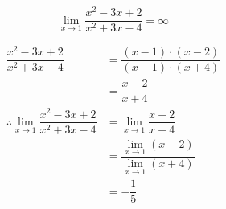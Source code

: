 \documentclass[14pt,fleqn]{extarticle}
\begin{document}
 

\begin{snippet}
    
    
    \incorrect

\[ \lim_{x\to 1} \dfrac{x^2-3x+2}{x^2+3x-4} = \infty\]
    
    \reason

\begin{align}
\dfrac{x^2-3x+2}{x^2 + 3x- 4} &= \dfrac{(x-1)\cdot (x-2)}{(x-1)\cdot (x+4)} \\ 
&= \dfrac{x-2}{x+4} \\ 
\therefore \lim_{x\to 1} \dfrac{x^2-3x+2}{x^2+3x-4} &= \lim_{x\to 1}\dfrac{x-2}{x+4} \\ 
&= \dfrac{\lim_{x\to 1} (x-2)}{\lim_{x\to 1}(x+4)} \\
&= -\dfrac{1}{5}
\end{align}
    
\end{snippet} 
\end{document}
